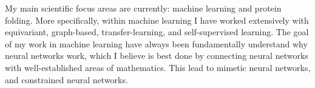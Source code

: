 


My main scientific focus areas are currently: machine learning and protein folding. More specifically, within machine learning I have worked extensively with equivariant, graph-based, transfer-learning, and self-supervised learning. The goal of my work in machine learning have always been fundamentally understand why neural networks work, which I believe is best done by connecting neural networks with well-established areas of mathematics. This lead to mimetic neural networks, and constrained neural networks.

